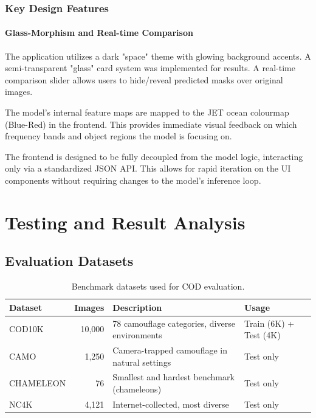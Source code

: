 \documentclass[12pt,a4paper]{report}
\begin{document}
\subsection{Key Design Features}

\subsubsection{Glass-Morphism and Real-time Comparison}
The application utilizes a dark "space" theme with glowing background accents. A semi-transparent "glass" card system was implemented for results. A real-time comparison slider allows users to hide/reveal predicted masks over original images.

The model's internal feature maps are mapped to the JET ocean colourmap (Blue-Red) in the frontend. This provides immediate visual feedback on which frequency bands and object regions the model is focusing on.

The frontend is designed to be fully decoupled from the model logic, interacting only via a standardized JSON API. This allows for rapid iteration on the UI components without requiring changes to the model's inference loop.

\chapter{Testing and Result Analysis}\label{chap:testing}

\section{Evaluation Datasets}

\begin{table}[H]
\centering
\caption{Benchmark datasets used for COD evaluation.}
\label{tab:datasets}
\begin{tabular}{@{}lrll@{}}
\toprule
\textbf{Dataset} & \textbf{Images} & \textbf{Description} & \textbf{Usage} \\
\midrule
COD10K    & 10,000 & 78 camouflage categories, diverse environments & Train (6K) + Test (4K) \\
CAMO      &  1,250 & Camera-trapped camouflage in natural settings  & Test only \\
CHAMELEON &     76 & Smallest and hardest benchmark (chameleons)    & Test only \\
NC4K      &  4,121 & Internet-collected, most diverse               & Test only \\
\bottomrule
\end{tabular}
\end{table}
\end{document}

